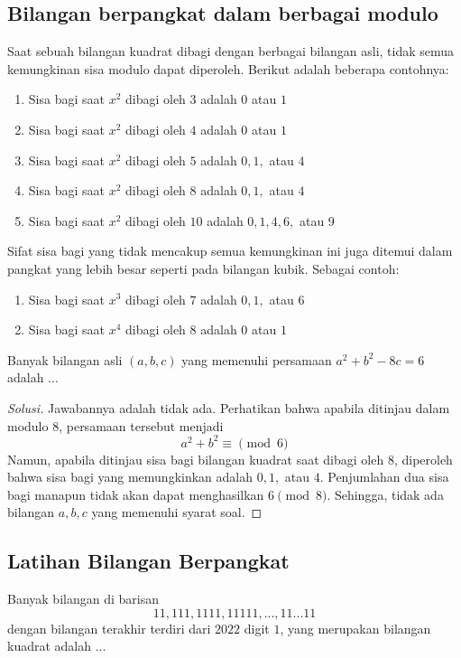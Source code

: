 \documentclass[11pt]{scrartcl}
\begin{document}
\subsection{Bilangan berpangkat dalam berbagai modulo}
Saat sebuah bilangan kuadrat dibagi dengan berbagai bilangan asli, tidak semua kemungkinan sisa modulo dapat diperoleh. Berikut adalah beberapa contohnya:
\begin{enumerate}
    \item Sisa bagi saat $x^2$ dibagi oleh $3$ adalah $0$ atau $1$
    \item Sisa bagi saat $x^2$ dibagi oleh $4$ adalah $0$ atau $1$
    \item Sisa bagi saat $x^2$ dibagi oleh $5$ adalah $0, 1,$ atau $4$
    \item Sisa bagi saat $x^2$ dibagi oleh $8$ adalah $0, 1,$ atau $4$
    \item Sisa bagi saat $x^2$ dibagi oleh $10$ adalah $0, 1, 4, 6,$ atau $9$
\end{enumerate}
Sifat sisa bagi yang tidak mencakup semua kemungkinan ini juga ditemui dalam pangkat yang lebih besar  seperti pada bilangan kubik. Sebagai contoh:
\begin{enumerate}
    \item Sisa bagi saat $x^3$ dibagi oleh $7$ adalah $0, 1,$ atau $6$
    \item Sisa bagi saat $x^4$ dibagi oleh $8$ adalah $0$ atau $1$
\end{enumerate}

\begin{example}
    Banyak bilangan asli $(a, b, c)$ yang memenuhi persamaan $a^2 + b^2 - 8c = 6$ adalah ...    
\end{example}

\begin{proof}[Solusi]
    Jawabannya adalah tidak ada. Perhatikan bahwa apabila ditinjau dalam modulo $8$, persamaan tersebut menjadi \[a^2 + b^2 \equiv \pmod{6}\]
    Namun, apabila ditinjau sisa bagi bilangan kuadrat saat dibagi oleh $8$, diperoleh bahwa sisa bagi yang memungkinkan adalah $0, 1,$ atau $4$. Penjumlahan dua sisa bagi manapun tidak akan dapat menghasilkan $6 \pmod{8}$. Sehingga, tidak ada bilangan $a, b, c$ yang memenuhi syarat soal.
\end{proof}

\subsection{Latihan Bilangan Berpangkat}
\begin{problem}
    Banyak bilangan di barisan \[11, 111, 1111, 11111, ..., 11...11\] dengan bilangan terakhir terdiri dari $2022$ digit $1$, yang merupakan bilangan kuadrat adalah ...
\end{problem}
\end{document}
